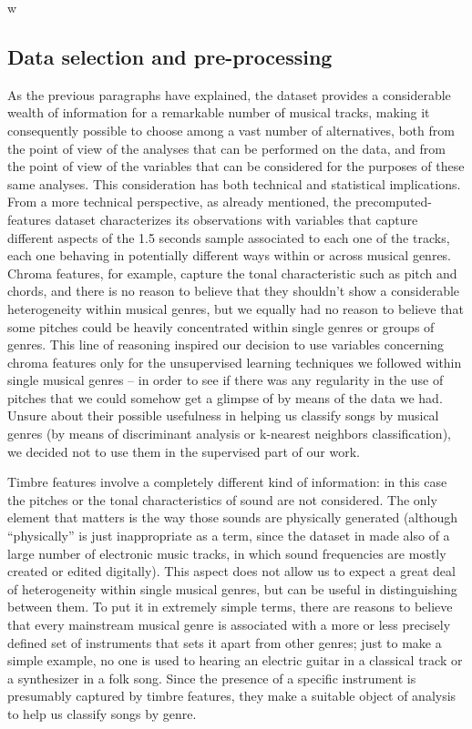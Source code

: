 w\documentclass[11pt, oneside]{article}
\begin{document}
\subsection{Data selection and pre-processing}
As the previous paragraphs have explained, the dataset provides a considerable wealth of information for a remarkable number of musical tracks, making it consequently possible to choose among a vast number of alternatives, both from the point of view of the analyses that can be performed on the data, and from the point of view of the variables that can be considered for the purposes of these same analyses. This consideration has both technical and statistical implications. From a more technical perspective, as already mentioned, the precomputed-features dataset characterizes its observations with variables that capture different aspects of the 1.5 seconds sample associated to each one of the tracks, each one behaving in potentially different ways within or across musical genres. Chroma features, for example, capture the tonal characteristic such as pitch and chords, and there is no reason to believe that they shouldn't show a considerable heterogeneity within musical genres, but we equally had no reason to believe that some pitches could be heavily concentrated within single genres or groups of genres. This line of reasoning inspired our decision to use variables concerning chroma features only  for the unsupervised learning techniques we followed within single musical genres -- in order to see if there was any regularity in the use of pitches that we could somehow get a glimpse of by means of the data we had. Unsure about their possible usefulness in helping us classify songs by musical genres (by means of discriminant analysis or k-nearest neighbors classification), we decided not to use them in the supervised part of our work.

Timbre features involve a completely different kind of information: in this case the pitches or the tonal characteristics of sound are not considered. The only element that matters is the way those sounds are physically generated (although “physically” is just inappropriate as a term, since the dataset in made also of a large number of electronic music tracks, in which sound frequencies are mostly created or edited digitally). This aspect does not allow us to expect a great deal of heterogeneity within single musical genres, but can be useful in distinguishing between them. To put it in extremely simple terms, there are reasons to believe that every mainstream musical genre is associated with a more or less precisely defined set of instruments that sets it apart from other genres; just to make a simple example, no one is used to hearing an electric guitar in a classical track or a synthesizer in a folk song. Since the presence of a specific instrument is presumably captured by timbre features, they make a suitable object of analysis to help us classify songs by genre.
\end{document}
